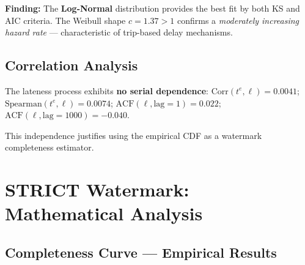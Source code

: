 \documentclass[11pt,a4paper]{article}
\newcommand{\eventtime}{t^{e}}
\newcommand{\lateness}{\ell}
\begin{document}
\textbf{Finding:} The \textbf{Log-Normal} distribution provides the best fit by both KS and AIC criteria.
The Weibull shape $c = 1.37 > 1$ confirms a \textit{moderately increasing hazard rate} --- characteristic of trip-based delay mechanisms.

\subsection{Correlation Analysis}

The lateness process exhibits \textbf{no serial dependence}:
$\text{Corr}(\eventtime, \lateness) = 0.0041$;
$\text{Spearman}(\eventtime, \lateness) = 0.0074$;
$\text{ACF}(\lateness, \text{lag}{=}1) = 0.022$;
$\text{ACF}(\lateness, \text{lag}{=}1000) = -0.040$.

This independence justifies using the empirical CDF as a watermark completeness estimator.

\section{STRICT Watermark: Mathematical Analysis}

\subsection{Completeness Curve --- Empirical Results}
\end{document}
